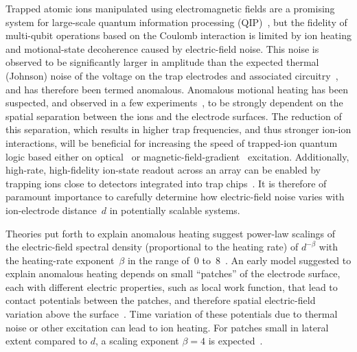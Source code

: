 \documentclass[reprint,twocolumn,prl,amsmath,amssymb,longbibliography,aps,superscriptaddress]{revtex4-1}
\begin{document}
Trapped atomic ions manipulated using electromagnetic fields are a promising system for large-scale quantum information processing (QIP)~\cite{Leibfried2003}, but the fidelity of multi-qubit operations based on the Coulomb interaction is limited by ion heating and motional-state decoherence caused by electric-field noise.  This noise is observed to be significantly larger in amplitude than the expected thermal (Johnson) noise of the voltage on the trap electrodes and associated circuitry~\cite{theBible,Turchette2000}, and has therefore been termed anomalous.  Anomalous motional heating has been suspected, and observed in a few experiments~\cite{Turchette2000,PhysRevLett.97.103007,hite_mckay_kotler_leibfried_wineland_pappas_2017,wunderlich_arXiv_2017}, to be strongly dependent on the spatial separation between the ions and the electrode surfaces.  The reduction of this separation, which results in higher trap frequencies, and thus stronger ion-ion interactions, will be beneficial for increasing the speed of trapped-ion quantum logic based either on optical~\cite{Inns:HiFi2qubit:NatPhys:08,PhysRevLett.117.060504,PhysRevLett.117.060505} or magnetic-field-gradient~\cite{PhysRevLett.117.140501} excitation.  Additionally, high-rate, high-fidelity ion-state readout across an array can be enabled by trapping ions close to detectors integrated into trap chips~\cite{KaranMehtaThesis,Slichter:17}.   It is therefore of paramount importance to carefully determine how electric-field noise varies with ion-electrode distance~$d$ in potentially scalable systems.

Theories put forth to explain anomalous heating suggest power-law scalings of the electric-field spectral density (proportional to the heating rate) of $d^{-\beta}$ with the heating-rate exponent~$\beta$ in the range of~$0$ to~$8$~\cite{Brownnutt2015}.  An early model suggested to explain anomalous heating depends on small ``patches'' of the electrode surface, each with different electric properties, such as local work function, that lead to contact potentials between the patches, and therefore spatial electric-field variation above the surface~\cite{theBible}.  Time variation of these potentials due to thermal noise or other excitation can lead to ion heating.  For patches small in lateral extent compared to $d$, a scaling exponent $\beta=4$ is expected~\cite{PhysRevA.80.031402,PhysRevA.84.053425}.
\end{document}
